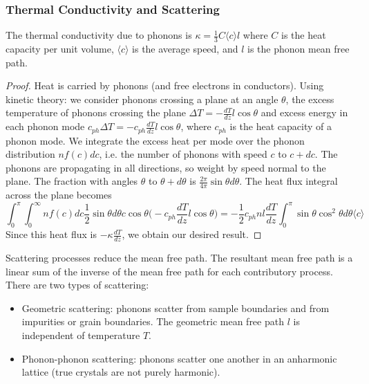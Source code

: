 \documentclass[a4paper]{article}
\begin{document}
\subsubsection*{Thermal Conductivity and Scattering}
\begin{thm}
The thermal conductivity due to phonons is $\kappa=\frac{1}{3}C\langle c\rangle l$ where $C$ is the heat capacity per unit volume, $\langle c\rangle$ is the average speed, and $l$ is the phonon mean free path.
\end{thm}
\begin{proof}
Heat is carried by phonons (and free electrons in conductors). Using kinetic theory: we consider phonons crossing a plane at an angle $\theta$, the excess temperature of phonons crossing the plane $\Delta T=-\frac{dT}{dz}l\cos\theta$ and excess energy in each phonon mode $c_{ph}\Delta T=-c_{ph}\frac{dT}{dz}l\cos\theta$, where $c_{ph}$ is the heat capacity of a phonon mode. We integrate the excess heat per mode over the phonon distribution $nf(c)dc$, i.e. the number of phonons with speed $c$ to $c+dc$. The phonons are propagating in all directions, so weight by speed normal to the plane. The fraction with angles $\theta$ to $\theta+d\theta$ is $\frac{2\pi}{4\pi}\sin\theta d\theta$. The heat flux integral across the plane becomes
$$\int_0^\pi\int_0^\infty nf(c)dc\frac{1}{2}\sin\theta d\theta c\cos\theta\bigg(-c_{ph}\frac{dT}{dz}l\cos\theta\bigg)=-\frac{1}{2}c_{ph}nl\frac{dT}{dz}\int_0^\pi\sin\theta\cos^2\theta d\theta\langle c\rangle$$
Since this heat flux is $-\kappa\frac{dT}{dz}$, we obtain our desired result. 
\end{proof}
\begin{Note}
Scattering processes reduce the mean free path. The resultant mean free path is a linear sum of the inverse of the mean free path for each contributory process. There are two types of scattering:
\begin{itemize}
    \item Geometric scattering: phonons scatter from sample boundaries and from impurities or grain boundaries. The geometric mean free path $l$ is independent of temperature $T$.
    \item Phonon-phonon scattering: phonons scatter one another in an anharmonic lattice (true crystals are not purely harmonic). 
\end{itemize}
\end{Note}
\end{document}
